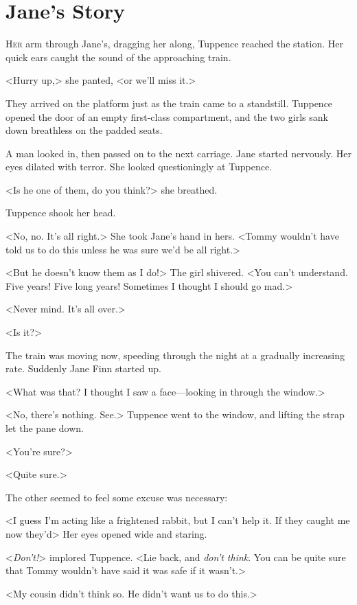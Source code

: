\chapter{Jane's Story} 

 \lettrine{H}{er} arm through Jane's, dragging her along, Tuppence reached the station. Her quick ears caught the sound of the approaching train.

\zz
<Hurry up,> she panted, <or we'll miss it.>

They arrived on the platform just as the train came to a standstill. Tuppence opened the door of an empty first-class compartment, and the two girls sank down breathless on the padded seats.

A man looked in, then passed on to the next carriage. Jane started nervously. Her eyes dilated with terror. She looked questioningly at Tuppence.

<Is he one of them, do you think?> she breathed.

Tuppence shook her head.

<No, no. It's all right.> She took Jane's hand in hers. <Tommy wouldn't have told us to do this unless he was sure we'd be all right.>

<But he doesn't know them as I do!> The girl shivered. <You can't understand. Five years! Five long years! Sometimes I thought I should go mad.>

<Never mind. It's all over.>

<Is it?>

The train was moving now, speeding through the night at a gradually increasing rate. Suddenly Jane Finn started up.

<What was that? I thought I saw a face—looking in through the window.>

<No, there's nothing. See.> Tuppence went to the window, and lifting the strap let the pane down.

<You're sure?>

<Quite sure.>

The other seemed to feel some excuse was necessary:

<I guess I'm acting like a frightened rabbit, but I can't help it. If they caught me now they'd\longdash> Her eyes opened wide and staring.

<\emph{Don't!}> implored Tuppence. <Lie back, and \emph{don't think}. You can be quite sure that Tommy wouldn't have said it was safe if it wasn't.>

<My cousin didn't think so. He didn't want us to do this.>

